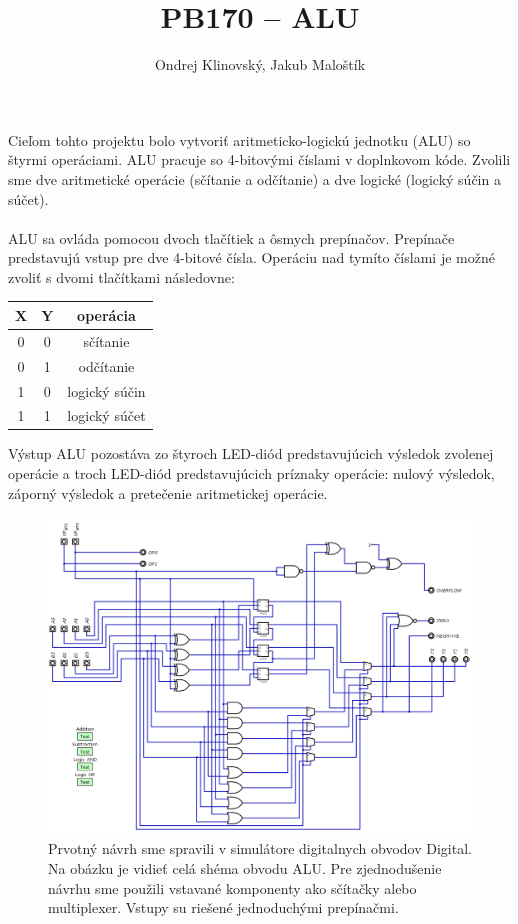 \documentclass{article}
\title{PB170 -- ALU}
\author{Ondrej Klinovský, Jakub Maloštík}
\begin{document}
    \maketitle

    \paragraph{}
    Cieľom tohto projektu bolo vytvoriť aritmeticko-logickú jednotku (ALU) so štyrmi operáciami. ALU pracuje so 4-bitovými číslami v doplnkovom kóde. Zvolili sme dve aritmetické operácie (sčítanie a odčítanie) a dve logické (logický súčin a súčet).
    \paragraph{}
    ALU sa ovláda pomocou dvoch tlačítiek a ôsmych prepínačov. Prepínače predstavujú vstup pre dve 4-bitové čísla. Operáciu nad tymíto číslami je možné zvoliť s dvomi tlačítkami následovne:
    \begin{center}
    \begin{tabular}{| c | c | c |}
        \hline
        X & Y & operácia \\
        \hline
        0 & 0 & sčítanie \\
        0 & 1 & odčítanie \\
        1 & 0 & logický súčin \\
        1 & 1 & logický súčet \\
        \hline
    \end{tabular}
    \end{center}
    Výstup ALU pozostáva zo štyroch LED-diód predstavujúcich výsledok zvolenej operácie a troch LED-diód predstavujúcich príznaky operácie: nulový výsledok, záporný výsledok a pretečenie aritmetickej operácie.

    \begin{figure}[h!]
        \centering
        \includegraphics[width=.9\linewidth]{sim.png}
        \caption{Prvotný návrh sme spravili v simulátore digitalnych obvodov Digital. Na obázku je vidieť celá shéma obvodu ALU. Pre zjednodušenie návrhu sme použili vstavané komponenty ako sčítačky alebo multiplexer. Vstupy su riešené jednoduchými prepínačmi.}
    \end{figure}
\end{document}

